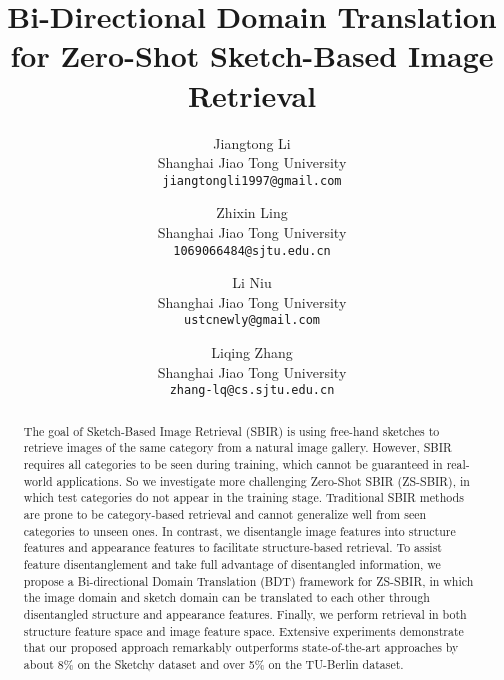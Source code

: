 \documentclass[10pt,twocolumn,letterpaper]{article}
\begin{document}
\title{Bi-Directional Domain Translation for Zero-Shot Sketch-Based Image Retrieval}

\author{Jiangtong Li\\
Shanghai Jiao Tong University\\
{\tt\small jiangtongli1997@gmail.com}
\and
Zhixin Ling\\
Shanghai Jiao Tong University\\
{\tt\small 1069066484@sjtu.edu.cn}
\and 
Li Niu\\
Shanghai Jiao Tong University\\
{\tt\small ustcnewly@gmail.com}
\and 
Liqing Zhang\\
Shanghai Jiao Tong University\\
{\tt\small zhang-lq@cs.sjtu.edu.cn}
}

\maketitle

\maketitle

\begin{abstract}
   The goal of Sketch-Based Image Retrieval (SBIR) is using free-hand sketches to retrieve images of the same category from a natural image gallery. 
   However, SBIR requires all categories to be seen during training, which cannot be guaranteed in real-world applications. 
   So we investigate more challenging Zero-Shot SBIR (ZS-SBIR), in which test categories do not appear in the training stage. 
   Traditional SBIR methods are prone to be category-based retrieval and cannot generalize well from seen categories to unseen ones. 
   In contrast, we disentangle image features into structure features and appearance features to facilitate structure-based retrieval.
   To assist feature disentanglement and take full advantage of disentangled information, we propose a Bi-directional Domain Translation (BDT) framework for ZS-SBIR, in which the image domain and sketch domain can be translated to each other through disentangled structure and appearance features.
   Finally, we perform retrieval in both structure feature space and image feature space. 
   Extensive experiments demonstrate that our proposed approach remarkably outperforms state-of-the-art approaches by about 8\% on the Sketchy dataset and over 5\% on the TU-Berlin dataset.
\end{abstract}
\end{document}
